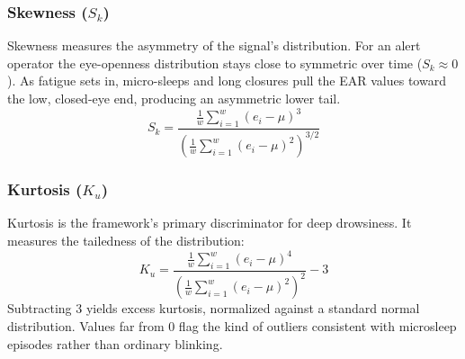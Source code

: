 \begin{table}[htbp]
\centering
\caption{Mathematical notations and definitions. \textit{These symbols define the statistical moments used to construct the feature vector $\mathbf{x}$, mapping raw physiological data into the decision space.}}
\label{tab:math_notation}
\end{table}

\subsubsection{Skewness ($S_k$)}
Skewness measures the asymmetry of the signal's distribution. For an alert operator the eye-openness distribution stays close to symmetric over time ($S_k \approx 0$). As fatigue sets in, micro-sleeps and long closures pull the EAR values toward the low, closed-eye end, producing an asymmetric lower tail.
\begin{equation}
    S_k = \frac{\frac{1}{w} \sum_{i=1}^w (e_i - \mu)^3}{\left(\frac{1}{w} \sum_{i=1}^w (e_i - \mu)^2\right)^{3/2}}
\end{equation}

\subsubsection{Kurtosis ($K_u$)}
Kurtosis is the framework's primary discriminator for deep drowsiness. It measures the tailedness of the distribution:
\begin{equation}
    K_u = \frac{\frac{1}{w} \sum_{i=1}^w (e_i - \mu)^4}{\left(\frac{1}{w} \sum_{i=1}^w (e_i - \mu)^2\right)^2} - 3
\end{equation}
Subtracting 3 yields excess kurtosis, normalized against a standard normal distribution. Values far from 0 flag the kind of outliers consistent with microsleep episodes rather than ordinary blinking.

